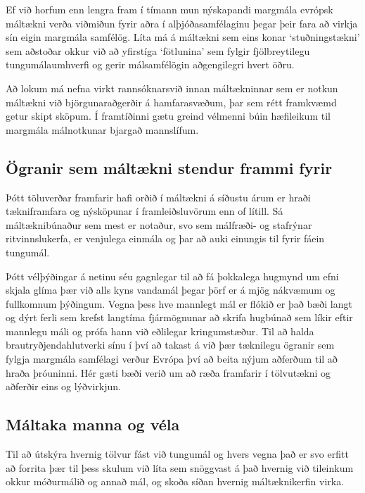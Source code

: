 \documentclass{../../metanetpaper}
\begin{document}
\begin{multicols}{2}

Ef við horfum enn lengra fram í tímann mun nýskapandi margmála evrópsk máltækni verða viðmiðun fyrir aðra í alþjóðasamfélaginu þegar þeir fara að virkja sín eigin margmála samfélög. Líta má á máltækni sem eins konar ‘stuðningstækni’ sem aðstoðar okkur við að yfirstíga ‘fötlunina’ sem fylgir fjölbreytilegu tungumálaumhverfi og gerir málsamfélögin aðgengilegri hvert öðru.

Að lokum má nefna virkt rannsóknarsvið innan máltækninnar sem er notkun máltækni við björgunaraðgerðir á hamfarasvæðum, þar sem rétt framkvæmd getur skipt sköpum. Í framtíðinni gætu greind vélmenni búin hæfileikum til margmála málnotkunar bjargað mannslífum.

\subsection{Ögranir sem máltækni stendur frammi fyrir}

Þótt töluverðar framfarir hafi orðið í máltækni á síðustu árum er hraði tækniframfara og nýsköpunar í framleiðsluvörum enn of lítill. Sá máltæknibúnaður sem mest er notaður, svo sem málfræði- og stafrýnar ritvinnslukerfa, er venjulega einmála og þar að auki einungis til fyrir fáein tungumál.


Þótt vélþýðingar á netinu séu gagnlegar til að fá þokkalega hugmynd um efni skjala glíma þær við alls kyns vandamál þegar þörf er á mjög nákvæmum og fullkomnum þýðingum. Vegna þess hve mannlegt mál er flókið er það bæði langt og dýrt ferli sem krefst langtíma fjármögnunar að skrifa hugbúnað sem líkir eftir mannlegu máli og prófa hann við eðlilegar kringumstæður. Til að halda brautryðjendahlutverki sínu í því að takast á við þær tæknilegu ögranir sem fylgja margmála samfélagi verður Evrópa því að beita nýjum aðferðum til að hraða þróuninni. Hér gæti bæði verið um að ræða framfarir í tölvutækni og aðferðir eins og lýðvirkjun.

\subsection{Máltaka manna og véla}

Til að útskýra hvernig tölvur fást við tungumál og hvers vegna það er svo erfitt að forrita þær til þess skulum við líta sem snöggvast á það hvernig við tileinkum okkur móðurmálið og annað mál, og skoða síðan hvernig máltæknikerfin virka.



\end{multicols}
\end{document}
